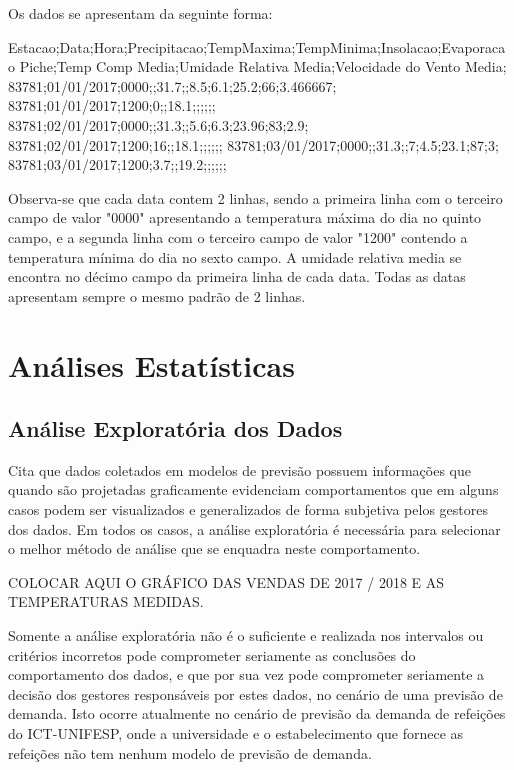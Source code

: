 \documentclass[	12pt, Times, openright, twoside, a4paper, english, brazil]{abntex2}
\begin{document}
Os dados se apresentam da seguinte forma: 
\begin{algorithm}[H]
Estacao;Data;Hora;Precipitacao;TempMaxima;TempMinima;Insolacao;Evaporacao Piche;Temp Comp Media;Umidade Relativa Media;Velocidade do Vento Media;
83781;01/01/2017;0000;;31.7;;8.5;6.1;25.2;66;3.466667;
83781;01/01/2017;1200;0;;18.1;;;;;;
83781;02/01/2017;0000;;31.3;;5.6;6.3;23.96;83;2.9;
83781;02/01/2017;1200;16;;18.1;;;;;;
83781;03/01/2017;0000;;31.3;;7;4.5;23.1;87;3;
83781;03/01/2017;1200;3.7;;19.2;;;;;;
\end{algorithm}

Observa-se que cada data contem 2 linhas, sendo a primeira linha com o terceiro campo de valor "0000" apresentando a temperatura máxima do dia no quinto campo, e a segunda linha com o terceiro campo de valor "1200" contendo a temperatura mínima do dia no sexto campo.
A umidade relativa media se encontra no décimo campo da primeira linha de cada data.
Todas as datas apresentam sempre o mesmo padrão de 2 linhas.
\section{Análises Estatísticas}
\subsection{Análise Exploratória dos Dados}
\cite{Junior2007} Cita que dados coletados em modelos de previsão possuem informações que quando são projetadas graficamente evidenciam comportamentos que em alguns casos podem ser visualizados e generalizados de forma subjetiva pelos gestores dos dados.  
Em todos os casos, a análise exploratória é necessária para selecionar o melhor método de análise que se enquadra neste comportamento.

COLOCAR AQUI O GRÁFICO DAS VENDAS DE 2017 / 2018 E AS TEMPERATURAS MEDIDAS.

Somente a análise exploratória não é o suficiente e realizada nos intervalos ou critérios incorretos pode comprometer seriamente as conclusões do comportamento dos dados, e que por sua vez pode comprometer seriamente a decisão dos gestores responsáveis por estes dados, no cenário de uma previsão de demanda. 
Isto ocorre atualmente no cenário de previsão da demanda de refeições do ICT-UNIFESP, onde a universidade e o estabelecimento que fornece as refeições não tem nenhum modelo de previsão de demanda. 
\end{document}
